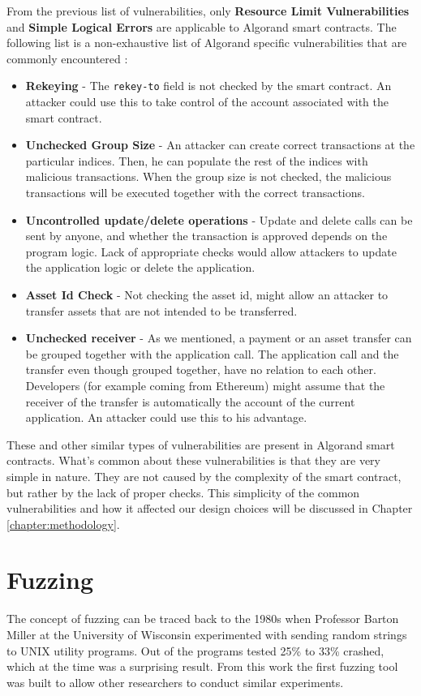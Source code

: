 From the previous list of vulnerabilities, only \textbf{Resource Limit Vulnerabilities} and \textbf{Simple Logical Errors} are applicable to Algorand smart contracts. The following list is a non-exhaustive list of Algorand specific vulnerabilities that are commonly encountered \cite{crytic_building-secure-contractsnot-so-smart-contractsalgorand_nodate,sun_panda_2023}:
\begin{itemize}
    \item \textbf{Rekeying} - The \texttt{rekey-to} field is not checked by the smart contract. An attacker could use this to take control of the account associated with the smart contract.
    \item \textbf{Unchecked Group Size} - An attacker can create correct transactions at the particular indices. Then, he can populate the rest of the indices with malicious transactions. When the group size is not checked, the malicious transactions will be executed together with the correct transactions.
    \item \textbf{Uncontrolled update/delete operations} - Update and delete calls can be sent by anyone, and whether the transaction is approved depends on the program logic. Lack of appropriate checks would allow attackers to update the application logic or delete the application.
    \item \textbf{Asset Id Check} - Not checking the asset id, might allow an attacker to transfer assets that are not intended to be transferred.
    \item \textbf{Unchecked receiver} - As we mentioned, a payment or an asset transfer can be grouped together with the application call. The application call and the transfer even though grouped together, have no relation to each other. Developers (for example coming from Ethereum) might assume that the receiver of the transfer is automatically the account of the current application. An attacker could use this to his advantage.
\end{itemize}

These and other similar types of vulnerabilities are present in Algorand smart contracts.
What's common about these vulnerabilities is that they are very simple in nature.
They are not caused by the complexity of the smart contract, but rather by the lack of proper checks.
This simplicity of the common vulnerabilities and how it affected our design choices will be discussed in Chapter \ref{chapter:methodology}.

\section{Fuzzing} \label{section:fuzzing}
The concept of fuzzing can be traced back to the 1980s when Professor Barton Miller at the University of Wisconsin experimented with sending random strings to UNIX utility programs.
Out of the programs tested 25\% to 33\% crashed, which at the time was a surprising result.
From this work the first fuzzing tool was built to allow other researchers to conduct similar experiments.

